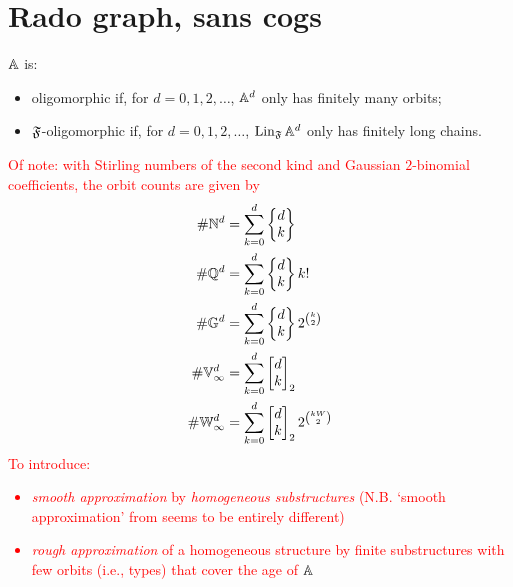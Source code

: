 \section{Rado graph, sans cogs}

$\mathbb{A}$ is: 
\begin{itemize}
    \item oligomorphic if, for $d = 0, 1, 2, \ldots$, $\mathbb{A}^d$ only has finitely many orbits;
    \item $\mathfrak{F}$-oligomorphic if, for $d = 0, 1, 2, \ldots$, $\operatorname{Lin}_{\mathfrak{F}} \mathbb{A}^d$ only has finitely long chains.
\end{itemize}
\textcolor{red}{
Of note: with Stirling numbers of the second kind and Gaussian $2$-binomial coefficients,
the orbit counts are given by
\begin{align*}
    \# \mathbb{N}^d &= \sum_{k=0}^d \begin{Bmatrix} d \\ k \end{Bmatrix} \\
    \# \mathbb{Q}^d &= \sum_{k=0}^d \begin{Bmatrix} d \\ k \end{Bmatrix} k! \\
    \# \mathbb{G}^d &= \sum_{k=0}^d \begin{Bmatrix} d \\ k \end{Bmatrix} 2^{\binom{k}{2}} \\
    \# \mathbb{V}_\infty^d &= \sum_{k=0}^d \begin{bmatrix} d \\ k \end{bmatrix}_2 \\
    \# \mathbb{W}_\infty^d &= \sum_{k=0}^d \begin{bmatrix} d \\ k \end{bmatrix}_2 2^{\binom{kW}{2}}
\end{align*}
To introduce: 
\begin{itemize}
    \item 
    \emph{smooth approximation} by \emph{homogeneous substructures} \cite{KLM89} (N.B. `smooth approximation' from \cite[Definition~4]{MP24} seems to be entirely different)
    \item 
    \emph{rough approximation} of a homogeneous structure by finite substructures with few orbits (i.e., types)
    that cover the age of $\mathbb{A}$
\end{itemize}}

